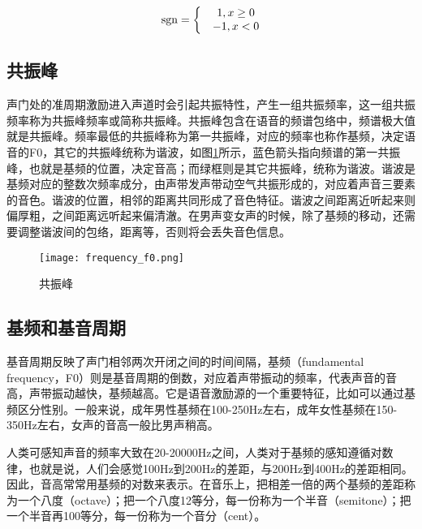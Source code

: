 \documentclass[cn,10pt,math=newtx,citestyle=gb7714-2015,bibstyle=gb7714-2015]{elegantbook}
\begin{document}
\begin{equation}
  {\rm sgn}=\left\{\begin{matrix}
    & 1,x \geq 0 \\ 
    & -1,x<0
   \end{matrix}\right.
\end{equation}

\subsection{共振峰}

声门处的准周期激励进入声道时会引起共振特性，产生一组共振频率，这一组共振频率称为共振峰频率或简称共振峰。共振峰包含在语音的频谱包络中，频谱极大值就是共振峰。频率最低的共振峰称为第一共振峰，对应的频率也称作基频，决定语音的F0，其它的共振峰统称为谐波，如图\ref{fig:frequency_f0}所示，蓝色箭头指向频谱的第一共振峰，也就是基频的位置，决定音高；而绿框则是其它共振峰，统称为谐波。谐波是基频对应的整数次频率成分，由声带发声带动空气共振形成的，对应着声音三要素的音色。谐波的位置，相邻的距离共同形成了音色特征。谐波之间距离近听起来则偏厚粗，之间距离远听起来偏清澈。在男声变女声的时候，除了基频的移动，还需要调整谐波间的包络，距离等，否则将会丢失音色信息。

\begin{figure}[htbp]
  \centering
  \texttt{[image: frequency\_f0.png]}
  \caption{共振峰 \label{fig:frequency_f0}}
\end{figure}

\subsection{基频和基音周期}

基音周期反映了声门相邻两次开闭之间的时间间隔，基频（fundamental frequency，F0）则是基音周期的倒数，对应着声带振动的频率，代表声音的音高，声带振动越快，基频越高。它是语音激励源的一个重要特征，比如可以通过基频区分性别。一般来说，成年男性基频在100-250Hz左右，成年女性基频在150-350Hz左右，女声的音高一般比男声稍高。

人类可感知声音的频率大致在20-20000Hz之间，人类对于基频的感知遵循对数律，也就是说，人们会感觉100Hz到200Hz的差距，与200Hz到400Hz的差距相同。因此，音高常常用基频的对数来表示。在音乐上，把相差一倍的两个基频的差距称为一个八度（octave）；把一个八度12等分，每一份称为一个半音（semitone）；把一个半音再100等分，每一份称为一个音分（cent）。
\end{document}
